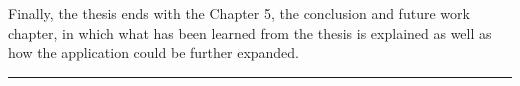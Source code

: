 \documentclass[12pt]{report}
\begin{document}
Finally, the thesis ends with the Chapter 5, the conclusion and future work chapter, in which what has been learned from the thesis is explained as well as how the application could be further expanded.
\vspace{0.5cm}	
\hrule
\vspace{0.5cm}	


\tableofcontents


\newpage
{}











\end{document}
